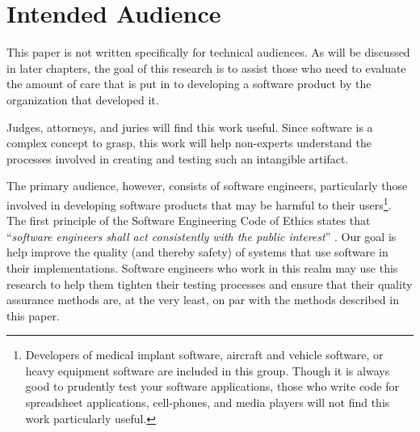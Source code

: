 \section{Intended Audience}

This paper is not written specifically for technical audiences. As will be
discussed in later chapters, the goal of this research is to assist those who
need to evaluate the amount of care that is put in to developing a software
product by the organization that developed it.

Judges, attorneys, and juries will find this work useful. Since software is a 
complex concept to grasp, this work will help non-experts understand the 
processes involved in creating and testing such an intangible artifact.

The primary audience, however, consists of software engineers, particularly
those involved in developing software products that may be harmful to their
users\footnote{Developers of medical implant software, aircraft and vehicle
software, or heavy equipment software are included in this group. Though it is
always good to prudently test your software applications, those who write code
for spreadsheet applications, cell-phones, and media players will not find this
work particularly useful.}. The first principle of the Software Engineering Code
of Ethics states that ``\textit{software engineers shall act consistently with
the public interest}'' \cite{SECODE}. Our goal is help improve the quality (and
thereby safety) of systems that use software in their implementations. Software
engineers who work in this realm may use this research to help them tighten
their testing processes and ensure that their quality assurance methods are, at
the very least, on par with the methods described in this paper.
